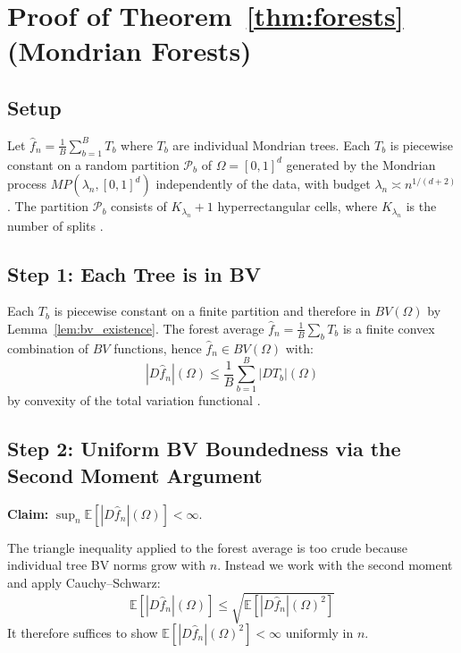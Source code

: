\documentclass[12pt]{article}
\newcommand{\E}{\mathbb{E}}
\newcommand{\BV}{BV(\Omega)}
\newcommand{\fn}{\hat{f}_n}
\begin{document}
	\section{Proof of Theorem~\ref{thm:forests} (Mondrian Forests)}
	\label{app:forests}
	
	\subsection{Setup}
	
	Let $\fn = \frac{1}{B}\sum_{b=1}^B T_b$ where $T_b$ are individual Mondrian
	trees. Each $T_b$ is piecewise constant on a random partition $\mathcal{P}_b$
	of $\Omega = [0,1]^d$ generated by the Mondrian process $MP(\lambda_n, [0,1]^d)$
	independently of the data, with budget $\lambda_n \asymp n^{1/(d+2)}$
	\citep{mourtada2017mondrian}. The partition $\mathcal{P}_b$ consists of
	$K_{\lambda_n} + 1$ hyperrectangular cells, where $K_{\lambda_n}$ is the
	number of splits \citep{roy2009mondrian}.
	
	\subsection{Step 1: Each Tree is in BV}
	
	Each $T_b$ is piecewise constant on a finite partition and therefore in
	$\BV$ by Lemma~\ref{lem:bv_existence}. The forest average $\fn =
	\frac{1}{B}\sum_b T_b$ is a finite convex combination of $BV$ functions,
	hence $\fn \in \BV$ with:
	\begin{equation}
		|D\fn|(\Omega) \leq \frac{1}{B} \sum_{b=1}^B |DT_b|(\Omega)
	\end{equation}
	by convexity of the total variation functional
	\citep[Proposition~3.6]{ambrosio2000bv}.
	
	\subsection{Step 2: Uniform BV Boundedness via the Second Moment Argument}
	
	\textbf{Claim:} $\sup_n \E[|D\fn|(\Omega)] < \infty$.
	
	The triangle inequality applied to the forest average is too crude because
	individual tree BV norms grow with $n$. Instead we work with the second
	moment and apply Cauchy--Schwarz:
	\begin{equation}
		\E\!\left[|D\fn|(\Omega)\right]
		\leq \sqrt{\E\!\left[|D\fn|(\Omega)^2\right]}
	\end{equation}
	It therefore suffices to show $\E[|D\fn|(\Omega)^2] < \infty$ uniformly
	in $n$.
	
\end{document}
